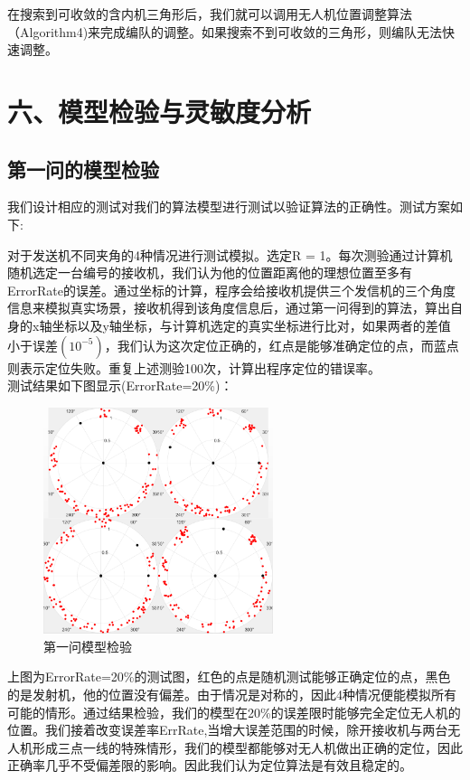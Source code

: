 \documentclass{my_paper}
\begin{document}
在搜索到可收敛的含内机三角形后，我们就可以调用无人机位置调整算法（Algorithm4)来完成编队的调整。如果搜索不到可收敛的三角形，则编队无法快速调整。

\section{六、模型检验与灵敏度分析}
\subsection{第一问的模型检验}
我们设计相应的测试对我们的算法模型进行测试以验证算法的正确性。测试方案如下:

对于发送机不同夹角的4种情况进行测试模拟。选定R = 1。每次测验通过计算机随机选定一台编号的接收机，我们认为他的位置距离他的理想位置至多有ErrorRate的误差。通过坐标的计算，程序会给接收机提供三个发信机的三个角度信息来模拟真实场景，接收机得到该角度信息后，通过第一问得到的算法，算出自身的x轴坐标以及y轴坐标，与计算机选定的真实坐标进行比对，如果两者的差值小于误差$(10^{-5})$，我们认为这次定位正确的，红点是能够准确定位的点，而蓝点则表示定位失败。重复上述测验100次，计算出程序定位的错误率。\\
测试结果如下图显示(ErrorRate=20\%)：
\begin{figure}[H]
    \centering
    \includegraphics[width=0.6\textwidth]{check1}
    \caption{第一问模型检验} 
\end{figure}

上图为ErrorRate=20\%的测试图，红色的点是随机测试能够正确定位的点，黑色的是发射机，他的位置没有偏差。由于情况是对称的，因此4种情况便能模拟所有可能的情形。通过结果检验，我们的模型在20\%的误差限时能够完全定位无人机的位置。我们接着改变误差率ErrRate,当增大误差范围的时候，除开接收机与两台无人机形成三点一线的特殊情形，我们的模型都能够对无人机做出正确的定位，因此正确率几乎不受偏差限的影响。因此我们认为定位算法是有效且稳定的。\\
\end{document}
